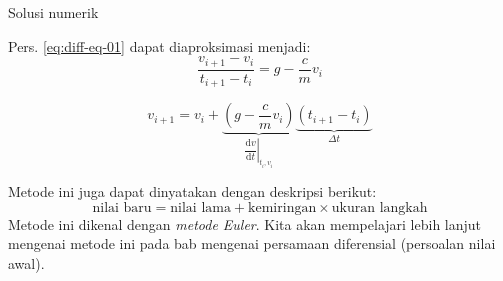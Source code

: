 \begin{frame}{Solusi numerik}

\fontsize{9pt}{10pt}\selectfont

Pers. \eqref{eq:diff-eq-01} dapat
diaproksimasi menjadi:
\begin{equation*}
\frac{v_{i+1} - v_{i}}{t_{i+1} - t_{i}} = g - \frac{c}{m} v_{i}
\end{equation*}

\begin{equation*}
v_{i+1} = v_{i} + \underbrace{\left( g - \frac{c}{m} v_{i} \right)}_{
  \left.\dfrac{\mathrm{d}v}{\mathrm{d}t}\right|_{t_{i},v_{i}}
}
\underbrace{\left( t_{i+1} - t_{i} \right)}_{\Delta t}
\end{equation*}

Metode ini juga dapat dinyatakan dengan deskripsi berikut:
\begin{equation*}
\text{nilai baru} = \text{nilai lama} + \text{kemiringan}\times\text{ukuran langkah}
\end{equation*}
Metode ini dikenal dengan \emph{metode Euler}. Kita akan mempelajari
lebih lanjut mengenai metode ini pada bab mengenai persamaan diferensial
(persoalan nilai awal).
\end{frame}



